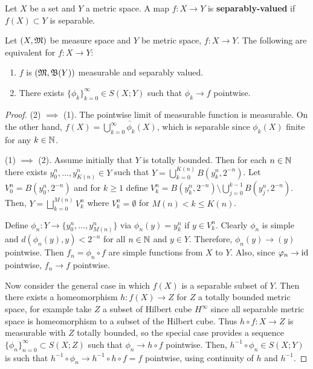 \documentclass[a4paper]{article}
\renewcommand{\seqinfn}[1]{\{ #1 \}_{n=0}^\infty}
\renewcommand{\cupinfk}{\bigcup_{k=0}^\infty}
\renewcommand{\seqinfk}[1]{\{ #1 \}_{k=0}^\infty}
\begin{document}
\begin{defi}
Let $X$ be a set and $Y$ a metric space. A map $f: X
\to Y$ is \textbf{separably-valued}
if $f(X) \subset Y$ is separable.
\end{defi}

\begin{thm}
  Let $(X, \mathfrak{M})$ be measure space and $Y$ be metric space,
  $f : X \to Y$. The following are equivalent for
  $f: X \to Y$:
  \begin{enumerate}
    \item $f$ is $(\mathfrak{M}, \mathfrak{B}(Y))$ measurable and
    separably valued.
    \item There exists $\seqinfk{\phi_k} \in S(X; Y)$
    such that $\phi_k \to f$ pointwise.
  \end{enumerate}
\end{thm}

\begin{proof}

(2) $\implies$ (1). The pointwise limit of measurable function
is measurable. On the other hand, $f(X) = \bar{\cupinfk \phi_k(X)}$,
which is separable since $\phi_k(X)$ finite for any $k \in \mathbb{N}$.

(1) $\implies$ (2). Assume initially that $Y$ is totally bounded.
Then for each $n \in \mathbb{N}$ there exists $y^n_0, \dots, y^n_{K(n)} \in Y$
such that $Y = \bigcup_{k=0}^{K(n)} B(y^n_k, 2^{-n})$.
Let $V^n_0 = B(y_0^n, 2^{-n})$ and for $k \geq 1$ define
$V^n_k = B(y^n_k, 2^{-n}) \setminus \bigcup_{j=0}^{k-1}
B(y^n_j, 2^{-n})$. Then, $Y = \bigsqcup_{k=0}^{M(n)} V_k^n$
where $V^n_k = \emptyset$ for $M(n) < k \leq K(n)$.

Define $\phi_n: Y \to \{ y_0^n, \dots, y_{M(n)}^n \}$
via $\phi_n(y) = y_k^n$ if $y \in V_k^n$. Clearly $\phi_n$
is simple and $d(\phi_n(y), y) < 2^{-n}$ for all $n \in \mathbb{N}$
and $y \in Y$. Therefore, $\phi_n(y) \to (y)$ pointwise.
Then $f_n = \phi_n \circ f$ are simple functions
from $X$ to $Y$. Also, since $\varphi_n \to \operatorname{id}$ pointwise,
$f_n \to f$ pointwise.

Now consider the general case in which $f(X)$ is a separable
subset of $Y$. Then there exists a homeomorphism $h: f(X)
\to Z$ for $Z$ a totally bounded metric space, for example
take $Z$ a subset of Hilbert cube $H^\infty$ since
all separable metric space is homeomorphism to a subset of
the Hilbert cube. Thus $h \circ f: X \to Z$ is measurable
with $Z$ totally bounded, so the special case provides
a sequence $\seqinfn{\phi_n} \subset S(X; Z)$ such that
$\phi_n \to h \circ f$ pointwise. Then,
$h^{-1} \circ \phi_n \in S(X; Y)$ is such that
$h^{-1} \circ \phi_n \to h^{-1} \circ h \circ f = f$
pointwise, using continuity of $h$ and $h^{-1}$.

\end{proof}
\end{document}
